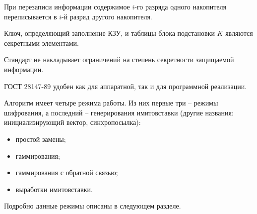 При перезаписи информации содержимое $i$-го разряда одного накопителя переписывается в $i$-й разряд другого накопителя.

Ключ, определяющий заполнение КЗУ, и таблицы блока подстановки $K$ являются секретными элементами.

Стандарт не накладывает ограничений на степень секретности защищаемой информации.

ГОСТ 28147-89 удобен как для аппаратной, так и для программной реализации.

Алгоритм имеет четыре режима работы. Из них первые три -- режимы шифрования, а  последний -- генерирования имитовставки (другие названия: инициализирующий вектор, синхропосылка):
\begin{itemize}
    \item простой замены;
    \item гаммирования;
    \item гаммирования с обратной связью;
    \item выработки имитовставки.
\end{itemize}


Подробно данные режимы описаны в следующем разделе.
